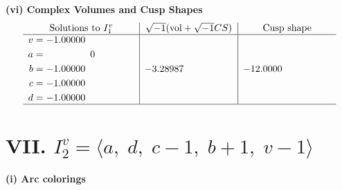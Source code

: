 \documentclass[1p]{elsarticle_modified}
\theoremstyle{definition}
\newcommand{\I}{\sqrt{-1}}
\begin{document}
\newpage\flushleft \textbf{(vi) Complex Volumes and Cusp Shapes}
$$\begin{array}{c|c|c}  
\text{Solutions to }I^v_{1}& \I (\text{vol} + \sqrt{-1}CS) & \text{Cusp shape}\\
 \hline 
\begin{aligned}
v &= -1.00000\phantom{ +0.000000I} \\
a &= \phantom{-0.000000 } 0 \\
b &= -1.00000\phantom{ +0.000000I} \\
c &= -1.00000\phantom{ +0.000000I} \\
d &= -1.00000\phantom{ +0.000000I}\end{aligned}
 & -3.28987\phantom{ +0.000000I} & -12.0000\phantom{ +0.000000I}\\
 \hline 
 \end{array}$$\newpage\newpage\renewcommand{\arraystretch}{1}
\centering \section*{VII. $I^v_{2}= \langle a,\;d,\;c-1,\;b+1,\;v-1 \rangle$}
\flushleft \textbf{(i) Arc colorings}\\
\end{document}
